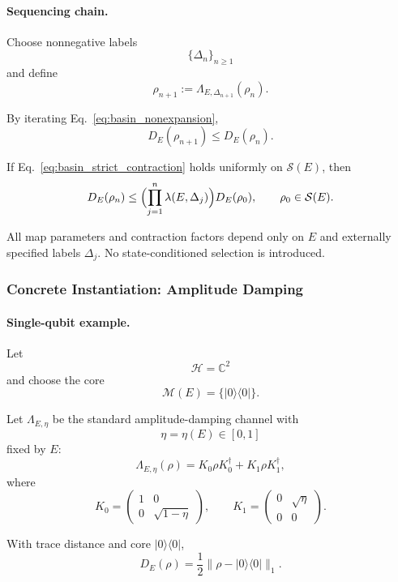 \documentclass[aps,prx,onecolumn,11pt]{revtex4-2}
\theoremstyle{plain}
\theoremstyle{definition}
\theoremstyle{remark}
\begin{document}
\paragraph{Sequencing chain.}

Choose nonnegative labels
\[
\{\Delta_n\}_{n\geq 1}
\]
and define
\[
\rho_{n+1}
:=
\Lambda_{E,\Delta_{n+1}}(\rho_n).
\]

By iterating Eq.~\eqref{eq:basin_nonexpansion},
\[
D_E(\rho_{n+1})
\leq
D_E(\rho_n).
\]

If Eq.~\eqref{eq:basin_strict_contraction} holds uniformly on
\(\mathcal S(E)\), then
\begin{equation}
D_E(\rho_n)
\leq
\Bigl(
\prod_{j=1}^n
\lambda(E,\Delta_j)
\Bigr)
D_E(\rho_0),
\qquad
\rho_0\in\mathcal S(E).
\label{eq:basin_iterated_descent}
\end{equation}

All map parameters and contraction factors depend only on \(E\) and
externally specified labels \(\Delta_j\). No state-conditioned
selection is introduced.

\subsubsection{Concrete Instantiation: Amplitude Damping}
\label{toy:basin_concrete_instantiation}

\paragraph{Single-qubit example.}

Let
\[
\mathcal H=\mathbb C^2
\]
and choose the core
\[
\mathcal M(E)
=
\{|0\rangle\langle0|\}.
\]

Let \(\Lambda_{E,\eta}\) be the standard amplitude-damping channel with
\[
\eta=\eta(E)\in[0,1]
\]
fixed by \(E\):
\[
\Lambda_{E,\eta}(\rho)
=
K_0\rho K_0^\dagger
+
K_1\rho K_1^\dagger,
\]
where
\[
K_0
=
\begin{pmatrix}
1 & 0\\
0 & \sqrt{1-\eta}
\end{pmatrix},
\qquad
K_1
=
\begin{pmatrix}
0 & \sqrt{\eta}\\
0 & 0
\end{pmatrix}.
\]

With trace distance and core \(|0\rangle\langle0|\),
\begin{equation}
D_E(\rho)
=
\frac12
\bigl\|
\rho-|0\rangle\langle0|
\bigr\|_1.
\label{eq:basin_depth_trace_qubit}
\end{equation}
\end{document}
